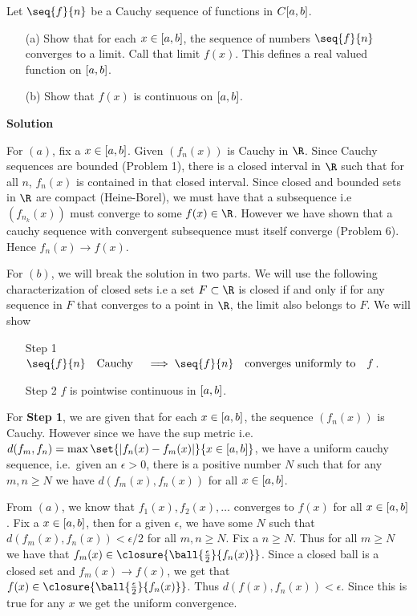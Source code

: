 \documentclass[11pt]{amstext-l}
\newcommand{\solution}{\textbf{\large Solution}}
\begin{document}
\pagebreak
\begin{homeworkProblem}[7]
    Let $\seq{f}{n}$ be a Cauchy sequence of functions in $C\interval{a}{b}$.
    \begin{itemize}
	\item[(a)] Show that for each $x \in \interval{a}{b}$, the sequence of numbers $\seq{f}{n}$
	    converges to a limit. Call that limit $f(x)$. This defines a real valued function on
	    $\interval{a}{b}$.
	\item[(b)] Show that $f(x)$ is continuous on $\interval{a}{b}$.
    \end{itemize}

    \solution{}

    For $(a)$, fix a $x \in \interval{a}{b}$. Given $\left(f_n(x)\right)$ is Cauchy in $\R$. Since Cauchy
    sequences are bounded (Problem 1), there is a closed interval in $\R$ such that for all $n$,
    ${f}_n(x)$ is contained in that closed interval. Since closed and bounded sets in $\R$ are compact
    (Heine-Borel), we must have that a subsequence i.e $\left(f_{n_k}(x)\right)$ must converge to some
    $f(x) \in \R$. However we have shown that a cauchy sequence with convergent subsequence must
    itself converge (Problem 6). Hence $f_n(x) \to f(x)$.

    
    For $(b)$, we will break the solution in two parts. We will use the following characterization
    of closed sets i.e a set $F \subset \R$ is closed if and only if for any sequence in $F$ 
    that converges to a point in $\R$, the limit also belongs to $F$. We will show 
    \begin{itemize}
	\item[Step 1] $\seq{f}{n} \quad \text{Cauchy} \quad \implies \seq{f}{n} \quad \text{converges uniformly to}
	    \quad f$.
	\item[Step 2] $f$ is pointwise continuous in $\interval{a}{b}$.
    \end{itemize}

    For \textbf{Step 1}, we are given that for each $x \in \interval{a}{b}$, the sequence
    $\left(f_n(x)\right)$ is Cauchy. However since we have the sup metric i.e. $d(f_m,f_n) =
    \max\set{\lvert f_n(x) - f_m(x) \rvert}{x \in \interval{a}{b}}$, we have a uniform cauchy
    sequence, i.e.\ given an $\epsilon > 0$, there is a positive number $N$ such that for any $m,n
    \geq N$ we have $d(f_m(x),f_n(x))$ for all $x \in \interval{a}{b}$.  

    From $(a)$, we know that $f_1(x),f_2(x), \ldots$ converges to $f(x)$ for all $x \in
    \interval{a}{b}$. Fix a $x \in \interval{a}{b}$, then for a given $\epsilon$, we have some $N$
    such that $d(f_m(x),f_n(x)) < \epsilon/2$ for all $m,n \geq N$. Fix a $n \geq N$. Thus for all $m
    \geq N$ we have that $f_m(x) \in \closure{\ball{\frac{\epsilon}{2}}{f_n(x)}}$. Since a closed
    ball is a closed set and $f_m(x) \to f(x)$, we get that $f(x) \in 
    \closure{\ball{\frac{\epsilon}{2}}{f_n(x)}}$. Thus $d(f(x),f_n(x)) < \epsilon$. Since this is
    true for any $x$ we get the uniform convergence.


\end{homeworkProblem}
\end{document}
